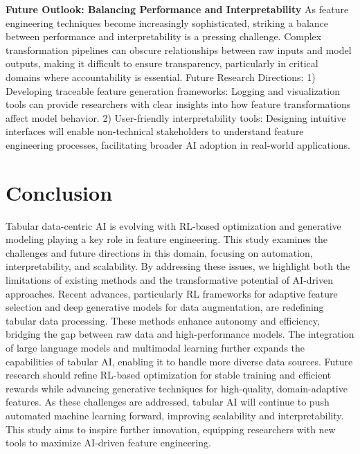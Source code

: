 \noindent\textbf{Future Outlook: Balancing Performance and Interpretability}
As feature engineering techniques become increasingly sophisticated, striking a balance between performance and interpretability is a pressing challenge. Complex transformation pipelines can obscure relationships between raw inputs and model outputs, making it difficult to ensure transparency, particularly in critical domains where accountability is essential. Future Research Directions:
1) Developing traceable feature generation frameworks: Logging and visualization tools can provide researchers with clear insights into how feature transformations affect model behavior.
2) User-friendly interpretability tools: Designing intuitive interfaces will enable non-technical stakeholders to understand feature engineering processes, facilitating broader AI adoption in real-world applications.

\vspace{-0.2cm}
\section{Conclusion}
Tabular data-centric AI is evolving with RL-based optimization and generative modeling playing a key role in feature engineering. This study examines the challenges and future directions in this domain, focusing on automation, interpretability, and scalability. By addressing these issues, we highlight both the limitations of existing methods and the transformative potential of AI-driven approaches.
Recent advances, particularly RL frameworks for adaptive feature selection and deep generative models for data augmentation, are redefining tabular data processing. These methods enhance autonomy and efficiency, bridging the gap between raw data and high-performance models. The integration of large language models and multimodal learning further expands the capabilities of tabular AI, enabling it to handle more diverse data sources.
Future research should refine RL-based optimization for stable training and efficient rewards while advancing generative techniques for high-quality, domain-adaptive features. As these challenges are addressed, tabular AI will continue to push automated machine learning forward, improving scalability and interpretability. This study aims to inspire further innovation, equipping researchers with new tools to maximize AI-driven feature engineering.